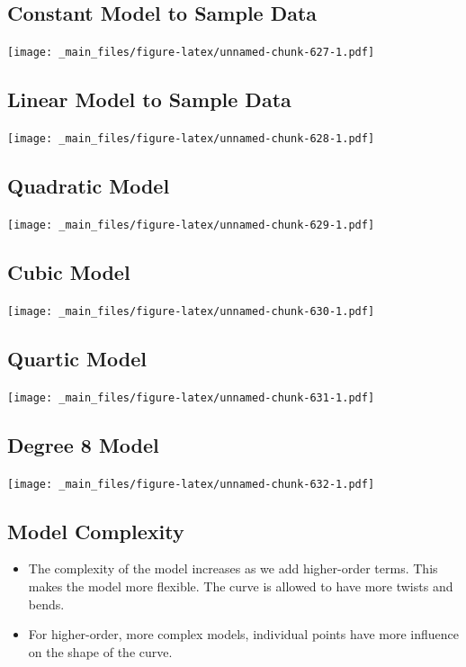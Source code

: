 \documentclass[]{book}
\begin{document}
\subsection{Constant Model to Sample
Data}\label{constant-model-to-sample-data}

\texttt{[image: \_main\_files/figure-latex/unnamed-chunk-627-1.pdf]}

\subsection{Linear Model to Sample
Data}\label{linear-model-to-sample-data-1}

\texttt{[image: \_main\_files/figure-latex/unnamed-chunk-628-1.pdf]}

\subsection{Quadratic Model}\label{quadratic-model}

\texttt{[image: \_main\_files/figure-latex/unnamed-chunk-629-1.pdf]}

\subsection{Cubic Model}\label{cubic-model-1}

\texttt{[image: \_main\_files/figure-latex/unnamed-chunk-630-1.pdf]}

\subsection{Quartic Model}\label{quartic-model}

\texttt{[image: \_main\_files/figure-latex/unnamed-chunk-631-1.pdf]}

\subsection{Degree 8 Model}\label{degree-8-model}

\texttt{[image: \_main\_files/figure-latex/unnamed-chunk-632-1.pdf]}

\subsection{Model Complexity}\label{model-complexity}

\begin{itemize}
\item
  The complexity of the model increases as we add higher-order terms.
  This makes the model more flexible. The curve is allowed to have more
  twists and bends.
\item
  For higher-order, more complex models, individual points have more
  influence on the shape of the curve.
\end{itemize}
\end{document}

